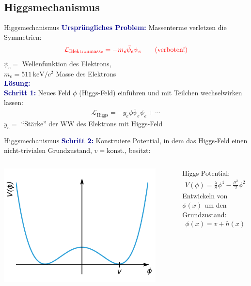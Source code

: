 \documentclass[hyperref={pdfpagelabels=false},ngerman]{beamer}
\newcommand{\Lagr}{\mathcal{L}}
\renewcommand{\emph}[1]{\textbf{\textcolor{darkblue}{#1}}}
\begin{document}
\subsection{Higgsmechanismus}

\begin{frame}{Higgsmechanismus}
  \emph{Ursprüngliches Problem:} Massenterme verletzen die Symmetrien:
  \begin{align*}
    \textcolor{red}{\Lagr_{\text{Elektronmasse}} =
    - m_e \bar{\psi}_e \psi_e \qquad (\text{verboten!})}
  \end{align*}
  $\psi_e =$ Wellenfunktion des Elektrons,\\
  $m_e = 511\,\text{keV}/c^2$ Masse des Elektrons
  \\[1em]
  \emph{Lösung:}\\ \emph{Schritt 1:}
  Neues Feld $\phi$ (Higgs-Feld) einführen und mit Teilchen
  wechselwirken lassen:
  \begin{align*}
    \Lagr_{\text{Higgs}} = - y_e \phi \bar{\psi}_e \psi_e + \cdots
  \end{align*}
  $y_e =$ ``Stärke'' der WW des Elektrons mit Higgs-Feld
\end{frame}

\begin{frame}{Higgsmechanismus}
  \emph{Schritt 2:} Konstruiere Potential, in dem das Higgs-Feld einen
  nicht-trivialen Grundzustand, $v=\text{konst}.$, besitzt:
  \begin{columns}
    \begin{center}
      \includegraphics[width=0.9\textwidth]{images/higgs-potential}
    \end{center}
    Higgs-Potential:
    \begin{align*}
      V(\phi) = \frac{\lambda}{8}\phi^4 - \frac{\mu^2}{2} \phi^2
    \end{align*}
    Entwickeln von $\phi(x)$ um den Grundzustand:
    \begin{align*}
      \phi(x) = v + h(x)
    \end{align*}
  \end{columns}
\end{frame}
\end{document}
